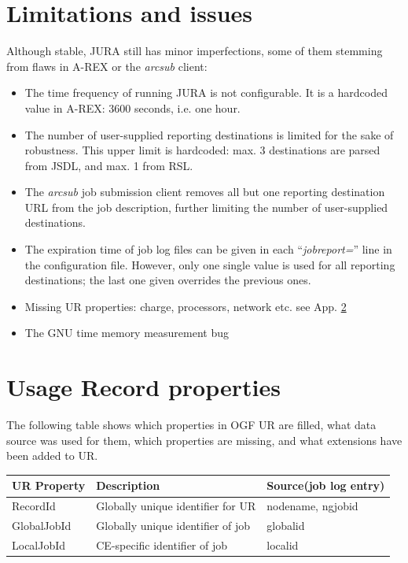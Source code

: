 \documentclass{article}                            %
\begin{document}
\section{Limitations and issues}
Although stable, JURA still has minor imperfections, some of them
stemming from flaws in A-REX or the \textit{arcsub} client:

\begin{itemize}
\item The time frequency of running JURA is not configurable. It is a
  hardcoded value in A-REX: 3600 seconds, i.e. one hour. 
\item The number of user-supplied reporting destinations is limited
  for the sake of robustness. This upper limit is hardcoded: max. 3
  destinations are parsed from JSDL, and max. 1 from RSL.
\item The \textit{arcsub} job submission client removes all but one
  reporting destination URL from the job description, further limiting
  the number of user-supplied destinations.
\item The expiration time of job log files can be given in each
  ``\textit{jobreport=}'' line in the configuration file. However,
  only one single value is used for all reporting destinations; the
  last one given overrides the previous ones.
\item Missing UR properties: charge, processors, network etc. see
  App. \ref{log2ur}
\item The GNU time memory measurement bug
\end{itemize}


\appendix

\section{Usage Record properties}
\label{log2ur}
The following table shows which properties in OGF UR are filled, what
data source was used for them, which properties are missing, and what
extensions have been added to UR.

\begin{tabular}{|p{}|p{}|p{}|}
\hline
\textbf{UR Property}&
\textbf{Description}&
\textbf{Source\newline(job log entry)}\\
\hline\hline
RecordId&
Globally unique identifier for UR&
nodename,\newline
ngjobid\\
\hline
GlobalJobId&
Globally unique identifier of job&
globalid\\
\hline
LocalJobId&
CE-specific identifier of job&
localid\\
\end{tabular}
\end{document}
